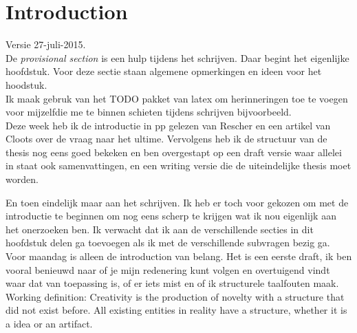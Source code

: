 \chapter{Introduction}

Versie 27-juli-2015.\\



De \textit{provisional section} is een hulp tijdens het schrijven. Daar begint het eigenlijke hoofdstuk. Voor deze sectie staan algemene opmerkingen en ideen voor het hoodstuk.\\


Ik maak gebruk van het TODO pakket van latex om herinneringen toe te voegen voor mijzelfdie me te binnen schieten tijdens schrijven bijvoorbeeld.\\


Deze week heb ik de introductie in pp gelezen van Rescher en een artikel van Cloots over de vraag naar het ultime. Vervolgens heb ik de structuur van de thesis nog eens goed bekeken en ben overgestapt op een draft versie waar allelei in staat ook samenvattingen, en een writing versie die de uiteindelijke thesis moet worden.

En toen eindelijk maar aan het schrijven. Ik heb er toch voor gekozen om met de introductie te beginnen om nog eens scherp te krijgen wat ik nou eigenlijk aan het onerzoeken ben. Ik verwacht dat ik aan de verschillende secties in dit hoofdstuk delen ga toevoegen als ik met de verschillende subvragen bezig ga.
Voor maandag is alleen de introduction van belang. Het is een eerste draft, ik ben vooral benieuwd naar of je mijn redenering kunt volgen en overtuigend vindt waar dat van toepassing is, of er iets mist en of ik structurele taalfouten maak.\\


Working definition:
Creativity is the production of novelty with a structure that did not exist before.
All existing entities in reality have a structure, whether it is a idea or an artifact.

